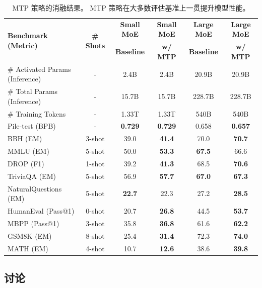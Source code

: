 \documentclass[11pt, a4paper, logo, copyright, nonumbering]{deepseek}
\let\oldfootnotesize\footnotesize
\renewcommand{\footnotesize}{\oldfootnotesize\itshape}
\begin{document}
\begin{table}[ht]
    \centering
    \footnotesize
    \setlength{\tabcolsep}{8pt}
    \begin{tabular}{@{}l c | c c | c c@{}}
    \toprule
    \multirow{2}{*}{\centering \textbf{Benchmark (Metric)}} & \multirow{2}{*}{\textbf{\# Shots}} & \textbf{Small MoE} & \textbf{Small MoE} & \textbf{Large MoE} & \textbf{Large MoE} \\
     & & \textbf{Baseline} & \textbf{w/ MTP} & \textbf{Baseline} & \textbf{w/ MTP} \\
    \midrule
    \# Activated Params {\tiny (Inference)} & - & 2.4B & 2.4B & 20.9B & 20.9B \\
    \# Total Params {\tiny (Inference)} & - & 15.7B & 15.7B & 228.7B & 228.7B \\
    \# Training Tokens & - & 1.33T & 1.33T & 540B & 540B \\
    \midrule
    Pile-test {\tiny (BPB)} & - & \textbf{0.729} & \textbf{0.729} & 0.658 & \textbf{0.657} \\
    BBH {\tiny (EM)} & 3-shot & 39.0 & \textbf{41.4} & 70.0 & \textbf{70.7} \\
    MMLU {\tiny (EM)} & 5-shot & 50.0 & \textbf{53.3} & \textbf{67.5} & 66.6 \\
    DROP {\tiny (F1)} & 1-shot & 39.2 & \textbf{41.3} & 68.5 & \textbf{70.6} \\
    TriviaQA {\tiny (EM)} & 5-shot & 56.9 & \textbf{57.7} & \textbf{67.0} & \textbf{67.3} \\
    NaturalQuestions {\tiny (EM)} & 5-shot & \textbf{22.7} & 22.3 & 27.2 & \textbf{28.5} \\
    HumanEval {\tiny (Pass@1)} & 0-shot & 20.7 & \textbf{26.8} & 44.5 & \textbf{53.7} \\
    MBPP {\tiny (Pass@1)} & 3-shot & 35.8 & \textbf{36.8} & 61.6 & \textbf{62.2} \\
    GSM8K {\tiny (EM)} & 8-shot & 25.4 & \textbf{31.4} & 72.3 & \textbf{74.0} \\
    MATH {\tiny (EM)} & 4-shot & 10.7 & \textbf{12.6} & 38.6 & \textbf{39.8} \\
    \bottomrule
    \end{tabular}
    \caption{
    MTP 策略的消融结果。
    MTP 策略在大多数评估基准上一贯提升模型性能。
    }
    \label{tab:ablation_nextn}
\end{table}

\subsection{讨论}
\end{document}

